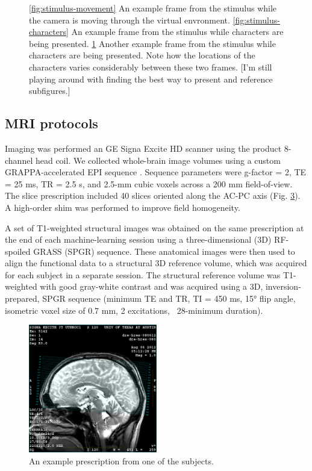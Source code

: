 \documentclass[final]{article}
\begin{document}
\begin{figure}[!htbp]
\begin{subfigure}[t]{0.3\textwidth}
\caption{}
\label{fig:stimulus-location}
\end{subfigure}
\caption{
\ref{fig:stimulus-movement} An example frame from the stimulus while the camera is moving through the virtual envronment. 
\ref{fig:stimulus-characters} An example frame from the stimulus while characters are being presented.
\ref{fig:stimulus-location} Another example frame from the stimulus while characters are being presented.
Note how the locations of the characters varies considerably between these two frames.
[I'm still playing around with finding the best way to present and reference subfigures.]}
\label{fig:stimulus}
\end{figure}

\subsection{MRI protocols}
Imaging was performed an GE Signa Excite HD scanner using the product 8-channel head coil.
We collected whole-brain image volumes using a custom GRAPPA-accelerated EPI sequence \cite{newbold}. 
Sequence parameters were g-factor = 2,  TE = 25 ms, TR = 2.5 s, and  2.5-mm cubic voxels across a 200 mm field-of-view. 
The slice prescription included 40 slices oriented along the AC-PC axis (Fig. \ref{fig:rx}). 
A high-order shim was  performed to improve field homogeneity.

A set of T1-weighted structural images was obtained on the same prescription at the end of each machine-learning session using a three-dimensional (3D) RF-spoiled GRASS (SPGR) sequence. 
These anatomical images were then used to align the functional data to a structural 3D reference volume, which was acquired for each subject in a separate session. 
The structural reference volume was T1-weighted with good gray-white contrast and was acquired using a 3D, inversion-prepared, SPGR sequence (minimum TE and TR, TI = 450 ms, 15° flip angle, isometric voxel size of 0.7 mm, 2 excitations, ~28-minimum duration).

\begin{figure}[!htbp]
\centering
\includegraphics[width=0.5\textwidth]{figures/rx}
\caption{An example prescription from one of the subjects.}
\label{fig:rx}
\end{figure}
\end{document}
